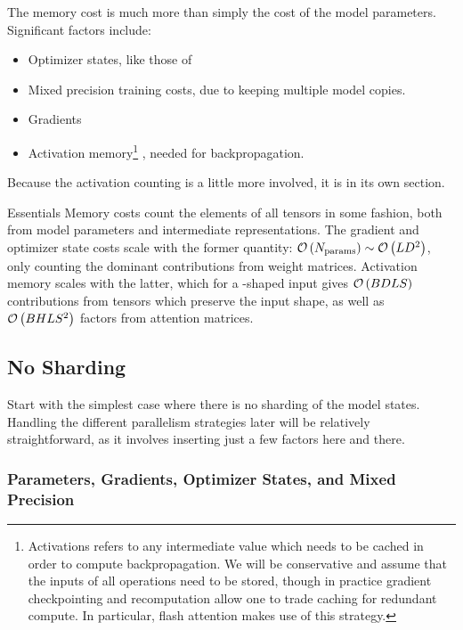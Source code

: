 \documentclass[11pt]{article}
\begin{document}
The memory cost is much more than simply the cost of the model
parameters. Significant factors include:
\begin{itemize}
\item Optimizer states, like those of 
\item Mixed precision training costs, due to keeping multiple model copies.
\item Gradients
\item Activation memory\footnote{Activations refers to any intermediate value which needs to be
    cached in order to compute backpropagation. We will be conservative and assume that the inputs
of all operations need to be stored, though in practice gradient checkpointing and recomputation
allow one to trade caching for redundant compute. In particular, flash attention
\cite{dao2022flashattention} makes use of this strategy.} , needed for backpropagation.
\end{itemize}
Because the activation counting is a little more involved, it is in its own section.


\begin{nicebox}{Essentials}
Memory costs count the elements of all tensors in some fashion, both from model parameters and
intermediate representations. The gradient and optimizer state costs scale with the former quantity:
$ \mathcal{O} \left ( N _{ {\rm params}  } \right ) \sim \mathcal{O} \left ( L D ^{ 2 } \right )$, only counting
the dominant contributions from weight matrices. Activation memory scales with the latter,
which for a -shaped input gives $ \mathcal{O} \left ( BDLS  \right ) $ contributions
from tensors which preserve the input shape, as well as $ \mathcal{O} \left( BHLS ^{ 2 } \right)  $
factors from attention matrices.
\end{nicebox}


\subsection{No Sharding}

Start with the simplest case where there is no sharding of the model states. Handling the different
parallelism strategies later will be relatively straightforward, as it involves inserting just a few
factors here and there.

\subsubsection{Parameters, Gradients, Optimizer States, and Mixed Precision
\label{sec_params_grads_optim_mem}}
\end{document}
